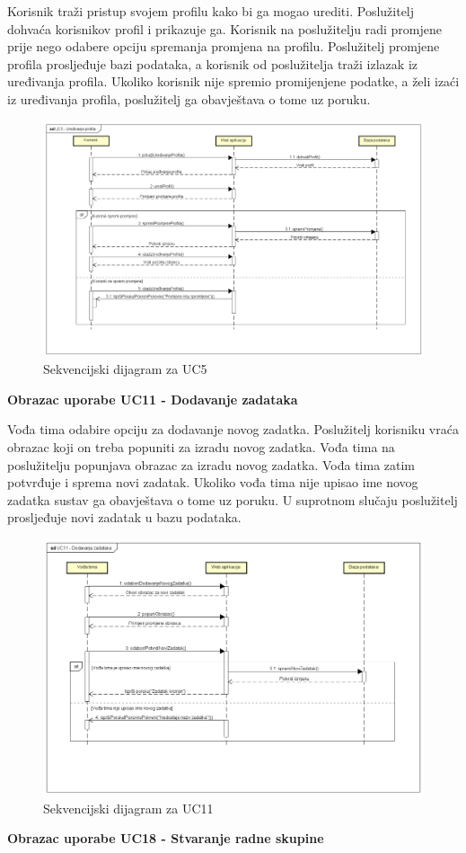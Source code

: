 				\par Korisnik traži pristup svojem profilu kako bi ga mogao urediti. Poslužitelj dohvaća korisnikov profil i prikazuje ga. Korisnik na poslužitelju radi promjene prije nego odabere opciju spremanja promjena na profilu. Poslužitelj promjene profila prosljeđuje bazi podataka, a korisnik od poslužitelja traži izlazak iz uređivanja profila. Ukoliko korisnik nije spremio promijenjene podatke, a želi izaći iz uređivanja profila, poslužitelj ga obavještava o tome uz poruku.
				\begin{figure}[h!]
					\includegraphics[width=\textwidth]{slike/Sekvencijski_UC5.png}
					\caption{Sekvencijski dijagram za UC5}
					\end{figure}
				\newpage
				\textbf{Obrazac uporabe UC11 - Dodavanje zadataka}
				
				\par Vođa tima odabire opciju za dodavanje novog zadatka. Poslužitelj korisniku vraća obrazac koji on treba popuniti za izradu novog zadatka. Vođa tima na poslužitelju popunjava obrazac za izradu novog zadatka. Vođa tima zatim potvrđuje i sprema novi zadatak. Ukoliko vođa tima nije upisao ime novog zadatka sustav ga obavještava o tome uz poruku. U suprotnom slučaju poslužitelj prosljeđuje novi zadatak u bazu podataka.
				\begin{figure}[h]
					\includegraphics[width=\textwidth]{slike/Sekvencijski_UC11.png}
					\caption{Sekvencijski dijagram za UC11}
					\end{figure}
				\newpage
				\textbf{Obrazac uporabe UC18 - Stvaranje radne skupine}
				
